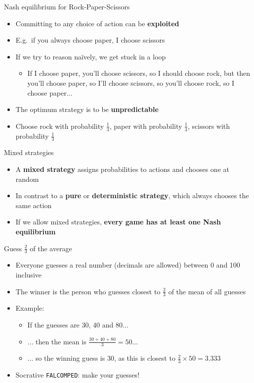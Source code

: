 \begin{frame}{Nash equilibrium for Rock-Paper-Scissors}
	\begin{itemize}
		\pause\item Committing to any choice of action can be \textbf{exploited}
		\pause\item E.g.\ if you always choose paper, I choose scissors
		\pause\item If we try to reason na\"ively, we get stuck in a loop
			\begin{itemize}
				\pause\item If I choose paper, you'll choose scissors, so I should choose rock, but then you'll choose paper,
					so I'll choose scissors, so you'll choose rock, so I choose paper...
			\end{itemize}
		\pause\item The optimum strategy is to be \textbf{unpredictable}
		\pause\item Choose rock with probability $\frac13$, paper with probability $\frac13$,
			scissors with probability $\frac13$
	\end{itemize}
\end{frame}

\begin{frame}{Mixed strategies}
	\begin{itemize}
		\pause\item A \textbf{mixed strategy} assigns probabilities to actions and chooses one at random
		\pause\item In contrast to a \textbf{pure} or \textbf{deterministic strategy}, which always chooses the same action
		\pause\item If we allow mixed strategies, \textbf{every game has at least one Nash equilibrium}
	\end{itemize}
\end{frame}

\begin{frame}{Guess $\frac23$ of the average}
	\begin{itemize}
		\pause\item Everyone guesses a real number (decimals are allowed) between 0 and 100 inclusive
		\pause\item The winner is the person who guesses closest to $\frac23$ of the mean of all guesses
		\pause\item Example:
			\begin{itemize}
				\pause\item If the guesses are 30, 40 and 80...
				\pause\item ... then the mean is $\frac{30+40+80}{3} = 50$...
				\pause\item ... so the winning guess is 30, as this is closest to $\frac23 \times 50 = 3.333$
			\end{itemize}
		\pause\item Socrative \texttt{FALCOMPED}: make your guesses!
	\end{itemize}
\end{frame}

